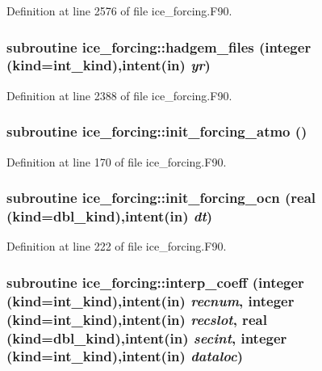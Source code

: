 Definition at line 2576 of file ice\_\-forcing.F90.\hypertarget{namespaceice__forcing_a47009d309c3885ec335b6595792ffb39}{
\subsubsection[{hadgem\_\-files}]{\setlength{\rightskip}{0pt plus 5cm}subroutine ice\_\-forcing::hadgem\_\-files (integer (kind=int\_\-kind),intent(in) {\em yr})}}
\label{namespaceice__forcing_a47009d309c3885ec335b6595792ffb39}


Definition at line 2388 of file ice\_\-forcing.F90.\hypertarget{namespaceice__forcing_aa113a0f4916cea9631de05496daf36c6}{
\subsubsection[{init\_\-forcing\_\-atmo}]{\setlength{\rightskip}{0pt plus 5cm}subroutine ice\_\-forcing::init\_\-forcing\_\-atmo ()}}
\label{namespaceice__forcing_aa113a0f4916cea9631de05496daf36c6}


Definition at line 170 of file ice\_\-forcing.F90.\hypertarget{namespaceice__forcing_a53be2f27b17125aea7195b3e14874b44}{
\subsubsection[{init\_\-forcing\_\-ocn}]{\setlength{\rightskip}{0pt plus 5cm}subroutine ice\_\-forcing::init\_\-forcing\_\-ocn (real (kind=dbl\_\-kind),intent(in) {\em dt})}}
\label{namespaceice__forcing_a53be2f27b17125aea7195b3e14874b44}


Definition at line 222 of file ice\_\-forcing.F90.\hypertarget{namespaceice__forcing_a9357ad1d7f2850b9ac32cb5f6b6aa7cb}{
\subsubsection[{interp\_\-coeff}]{\setlength{\rightskip}{0pt plus 5cm}subroutine ice\_\-forcing::interp\_\-coeff (integer (kind=int\_\-kind),intent(in) {\em recnum}, \/  integer (kind=int\_\-kind),intent(in) {\em recslot}, \/  real (kind=dbl\_\-kind),intent(in) {\em secint}, \/  integer (kind=int\_\-kind),intent(in) {\em dataloc})}}
\label{namespaceice__forcing_a9357ad1d7f2850b9ac32cb5f6b6aa7cb}


